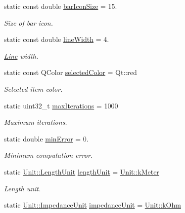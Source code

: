 \begin{DoxyCompactItemize}
\item 
static const double \hyperlink{group___models_gaa334bbc93b3fde219840e95e23198b53}{bar\+Icon\+Size} = 15.
\begin{DoxyCompactList}\small\item\em Size of bar icon. \end{DoxyCompactList}\item 
static const double \hyperlink{group___models_ga3f810634c9908d62d33a1ab09a76c147}{line\+Width} = 4.
\begin{DoxyCompactList}\small\item\em \hyperlink{class_line}{Line} width. \end{DoxyCompactList}\item 
static const Q\+Color \hyperlink{group___models_gaa9e21b8e2a24b0495e776a51e1aeed94}{selected\+Color} = Qt\+::red
\begin{DoxyCompactList}\small\item\em Selected item color. \end{DoxyCompactList}\item 
static uint32\+\_\+t \hyperlink{group___models_ga318dee060bc577eacd67d332efbbe1b2}{max\+Iterations} = 1000
\begin{DoxyCompactList}\small\item\em Maximum iterations. \end{DoxyCompactList}\item 
static double \hyperlink{group___models_gabcdc973129d3dda7572b7a1c388da1b5}{min\+Error} = 0.
\begin{DoxyCompactList}\small\item\em Minimum computation error. \end{DoxyCompactList}\item 
static \hyperlink{class_unit_a8c8921f7b225ad6063b1cb573425b9a0}{Unit\+::\+Length\+Unit} \hyperlink{group___models_gae46c0e2bf39b343875e3c69066fe2652}{length\+Unit} = \hyperlink{class_unit_a8c8921f7b225ad6063b1cb573425b9a0abfa41ebe7ee649a1f02c9b8ae570434b}{Unit\+::k\+Meter}
\begin{DoxyCompactList}\small\item\em Length unit. \end{DoxyCompactList}\item 
static \hyperlink{class_unit_a3747e779c805df24a71961290be3fbdf}{Unit\+::\+Impedance\+Unit} \hyperlink{group___models_ga5f3d72699a723c64a89d22e34df708ff}{impedance\+Unit} = \hyperlink{class_unit_a3747e779c805df24a71961290be3fbdfa6b9c74d1763eefbaf751eeecff0bd9da}{Unit\+::k\+Ohm}

\end{DoxyCompactItemize}
